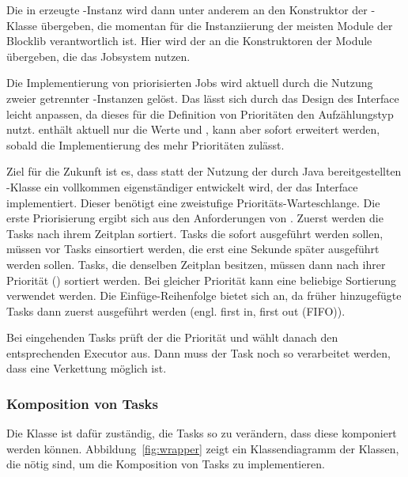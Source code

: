 Die in \classGame{} erzeugte \classBlocklibExecutor{}-Instanz wird dann unter anderem an den Konstruktor der \classContext{}-Klasse übergeben, die momentan für die Instanziierung der meisten Module der Blocklib verantwortlich ist. Hier wird der \classBlocklibExecutor{} an die Konstruktoren der Module übergeben, die das Jobsystem nutzen.

Die Implementierung von priorisierten Jobs wird aktuell durch die Nutzung zweier getrennter \classExecutor{}-Instanzen gelöst. Das lässt sich durch das Design des Interface \classBlocklibExecutorService{} leicht anpassen, da dieses für die Definition von Prioritäten den Aufzählungstyp \classTaskPriority{} nutzt. \classTaskPriority{} enthält aktuell nur die Werte  und , kann aber sofort erweitert werden, sobald die Implementierung des \classBlocklibExecutorService{} mehr Prioritäten zulässt. 

Ziel für die Zukunft ist es, dass statt der Nutzung der durch Java bereitgestellten \classScheduledThreadPoolExecutor{}-Klasse ein vollkommen eigenständiger \classExecutorService{} entwickelt wird, der das Interface \classBlocklibExecutorService{} implementiert. Dieser benötigt eine zweistufige Prioritäts-Warteschlange. Die erste Priorisierung ergibt sich aus den Anforderungen von \classScheduledExecutorService{}. Zuerst werden die Tasks nach ihrem Zeitplan sortiert. Tasks die sofort ausgeführt werden sollen, müssen vor Tasks einsortiert werden, die erst eine Sekunde später ausgeführt werden sollen. Tasks, die denselben Zeitplan besitzen, müssen dann nach ihrer Priorität (\classTaskPriority{}) sortiert werden. Bei gleicher Priorität kann eine beliebige Sortierung verwendet werden. Die Einfüge-Reihenfolge bietet sich an, da früher hinzugefügte Tasks dann zuerst ausgeführt werden (engl. first in, first out (FIFO)).

Bei eingehenden Tasks prüft der \classBlocklibExecutor{} die Priorität und wählt danach den entsprechenden Executor aus. Dann muss der Task noch so verarbeitet werden, dass eine Verkettung möglich ist.

\subsubsection{Komposition von Tasks}\label{sec:Verkettung}
Die Klasse \classCompletableFutureWrapper{} ist dafür zuständig, die Tasks so zu verändern, dass diese komponiert werden können. Abbildung~\ref{fig:wrapper} zeigt ein Klassendiagramm der Klassen, die nötig sind, um die Komposition von Tasks zu implementieren. 

